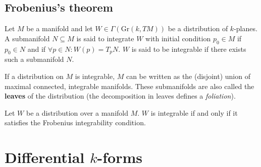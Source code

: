 \subsection{Frobenius's theorem}


    \begin{definition}[Integrable]
        Let $M$ be a manifold and let $W\in\Gamma(\mathrm{Gr}(k, TM))$ be a distribution of $k$-planes. A submanifold $N\subseteq M$ is said to integrate $W$ with initial condition $p_0\in M$ if $p_0\in N$ and if $\forall p\in N:W(p) = T_pN$. $W$ is said to be integrable if there exists such a submanifold $N$.
    \end{definition}
    \begin{property}
        If a distribution on $M$ is integrable, $M$ can be written as the (disjoint) union of maximal connected, integrable manifolds. These submanifolds are also called the \textbf{leaves} of the distribution (the decomposition in leaves defines a \textit{foliation}).
    \end{property}

    \begin{theorem}\label{bundle:frobenius}
        Let $W$ be a distribution over a manifold $M$. $W$ is integrable if and only if it satisfies the Frobenius integrability condition.
    \end{theorem}

\section{Differential \texorpdfstring{$k$}{k}-forms}\label{section:forms}


